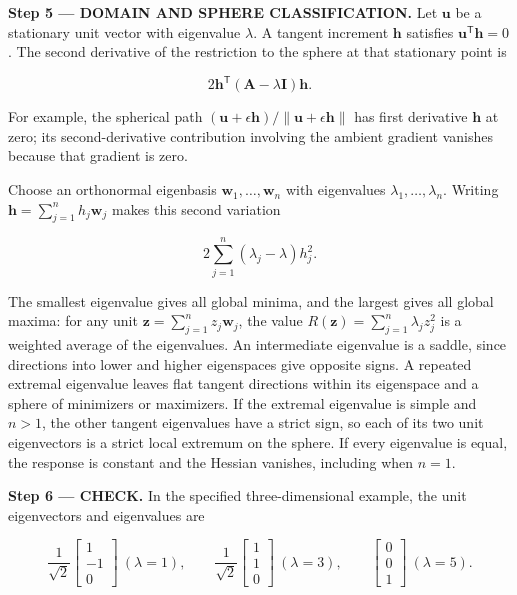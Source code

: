 \documentclass[11pt,oneside,openany]{book}
\begin{document}
\endgroup
\begin{DomainStep}
\textbf{Step 5 --- DOMAIN AND SPHERE CLASSIFICATION.} Let \(\mathbf u\) be a stationary unit vector with eigenvalue \(\lambda\). A tangent increment \(\mathbf h\) satisfies \(\mathbf u^{\mathsf T}\mathbf h=0\). The second derivative of the restriction to the sphere at that stationary point is

\[
2\mathbf h^{\mathsf T}(\mathbf A-\lambda\mathbf I)\mathbf h.
\]

For example, the spherical path \((\mathbf u+\epsilon\mathbf h)/\|\mathbf u+\epsilon\mathbf h\|\) has first derivative \(\mathbf h\) at zero; its second-derivative contribution involving the ambient gradient vanishes because that gradient is zero.

Choose an orthonormal eigenbasis \(\mathbf w_1,\ldots,\mathbf w_n\) with eigenvalues \(\lambda_1,\ldots,\lambda_n\). Writing \(\mathbf h=\sum_{j=1}^n h_j\mathbf w_j\) makes this second variation

\[
2\sum_{j=1}^n(\lambda_j-\lambda)h_j^2.
\]

The smallest eigenvalue gives all global minima, and the largest gives all global maxima: for any unit \(\mathbf z=\sum_{j=1}^n z_j\mathbf w_j\), the value \(R(\mathbf z)=\sum_{j=1}^n\lambda_j z_j^2\) is a weighted average of the eigenvalues. An intermediate eigenvalue is a saddle, since directions into lower and higher eigenspaces give opposite signs. A repeated extremal eigenvalue leaves flat tangent directions within its eigenspace and a sphere of minimizers or maximizers. If the extremal eigenvalue is simple and \(n>1\), the other tangent eigenvalues have a strict sign, so each of its two unit eigenvectors is a strict local extremum on the sphere. If every eigenvalue is equal, the response is constant and the Hessian vanishes, including when \(n=1\).

\end{DomainStep}
\textbf{Step 6 --- CHECK.} In the specified three-dimensional example, the unit eigenvectors and eigenvalues are

\[
\frac{1}{\sqrt2}\begin{bmatrix}1\\-1\\0\end{bmatrix}\ (\lambda=1),\qquad
\frac{1}{\sqrt2}\begin{bmatrix}1\\1\\0\end{bmatrix}\ (\lambda=3),\qquad
\begin{bmatrix}0\\0\\1\end{bmatrix}\ (\lambda=5).
\]
\end{document}
